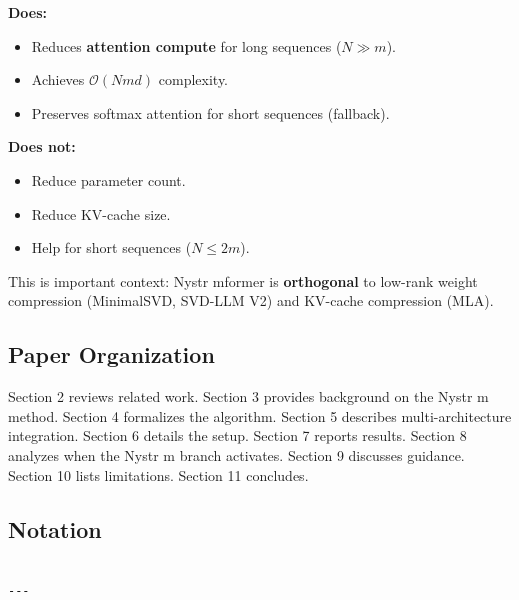 \textbf{Does:}
\begin{itemize}
\item Reduces \textbf{attention compute} for long sequences ($N \gg m$).
\item Achieves $\mathcal{O}(N m d)$ complexity.
\item Preserves softmax attention for short sequences (fallback).

\end{itemize}
\textbf{Does not:}
\begin{itemize}
\item Reduce parameter count.
\item Reduce KV-cache size.
\item Help for short sequences ($N \leq 2m$).

\end{itemize}
This is important context: Nystr mformer is \textbf{orthogonal} to low-rank 
weight compression (MinimalSVD, SVD-LLM V2) and KV-cache compression (MLA).

\subsection{Paper Organization}

Section 2 reviews related work. Section 3 provides background on the 
Nystr m method. Section 4 formalizes the algorithm. Section 5 describes 
multi-architecture integration. Section 6 details the setup. Section 7 
reports results. Section 8 analyzes when the Nystr m branch activates. 
Section 9 discusses guidance. Section 10 lists limitations. Section 11 
concludes.



\subsection{Notation}

\begin{lstlisting}

---
\end{lstlisting}